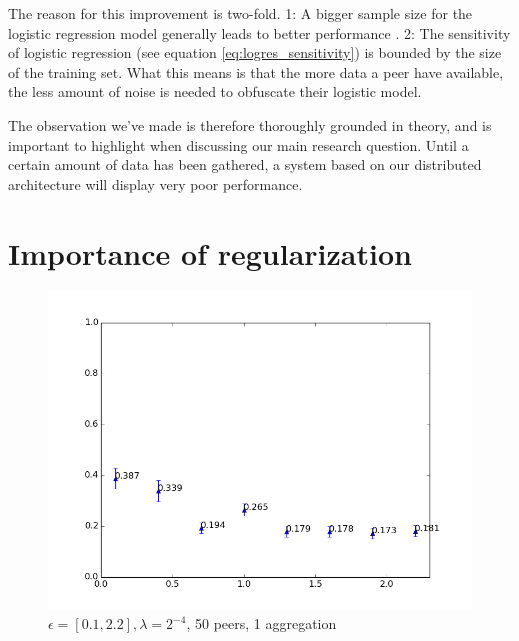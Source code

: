 The reason for this improvement is two-fold. 1: A bigger sample size for the logistic regression model generally leads to better performance \cite{peduzzi1996simulation}. 2: The sensitivity of logistic regression (see equation \ref{eq:logres_sensitivity}) is bounded by the size of the training set. What this means is that the more data a peer have available, the less amount of noise is needed to obfuscate their logistic model. 

The observation we've made is therefore thoroughly grounded in theory, and is important to highlight when discussing our main research question. Until a certain amount of data has been gathered, a system based on our distributed architecture will display very poor performance.   

\section{Importance of regularization}

\begin{figure}[h!]
	\centering
	\includegraphics[width=\textwidth]{fig/eps0.1-2.2,bud=eps,peers50,groups50,reg2e-4}
	\caption{$\epsilon = [0.1, 2.2], \lambda = 2^{-4}$, 50 peers, 1 aggregation}
	\label{fig:linear_epsilon_range}
\end{figure}

